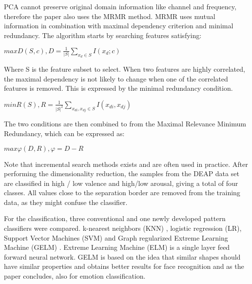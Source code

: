 \npar

PCA cannot preserve original domain information like channel and frequency, therefore the paper also uses the MRMR method. MRMR uses mutual information in combination with maximal dependency criterion and minimal redundancy. The algorithm starts by searching features satisfying:

\begin{center}
$max D(S,c), D=\frac{1}{|S|} {\displaystyle \sum_{x_d \in S}} I(x_d;c)$
\end{center}

Where S is the feature subset to select. When two features are highly correlated, the maximal dependency is not likely to change when one of the correlated features is removed. This is expressed by the minimal redundancy condition.

\begin{center}
$min R(S), R = \frac{1}{|S|^2} {\displaystyle \sum_{x_{di}, x_{dj} \in S}} I(x_{di},x_{dj})$
\end{center}

The two conditions are then combined to from the Maximal Relevance Minimum Redundancy, which can be expressed as:

\begin{center}
$max \varphi(D,R), \varphi=D-R$
\end{center}

Note that incremental search methods exists and are often used in practice. After performing the dimensionality reduction, the samples from the DEAP data set are classified in high / low valence and high/low arousal, giving a total of four classes. All values close to the separation border are removed from the training data, as they might confuse the classifier. 

\clearpage

For the classification, three conventional and one newly developed pattern classifiers were compared. k-nearest neighbors (KNN) , logistic regression (LR), Support Vector Machines (SVM) and Graph regularized Extreme Learning Machine (GELM) . Extreme Learning Machine (ELM)  is a single layer feed forward neural network\citep{ELMpaper}. GELM is based on the idea that similar shapes should have similar properties and obtains better results for face recognition \citep{GELMpaper} and as the paper concludes, also for emotion classification.

